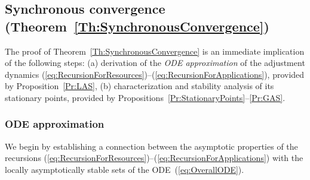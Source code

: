 \documentclass[letter,11pt]{article}
\begin{document}
\subsection{Synchronous convergence (Theorem~\ref{Th:SynchronousConvergence})}	
\label{sec:TD:SynchronousConvergence}

The proof of Theorem~\ref{Th:SynchronousConvergence} is an immediate implication of the following steps: (a) derivation of the \textit{ODE approximation} of the adjustment dynamics (\ref{eq:RecursionForResources})--(\ref{eq:RecursionForApplications}), provided by Proposition~\ref{Pr:LAS}, (b) characterization and stability analysis of its stationary points, provided by Propositions~\ref{Pr:StationaryPoints}--\ref{Pr:GAS}. 

\subsubsection{ODE approximation}	
\label{sec:TD:SC:ODE}

We begin by establishing a connection between the asymptotic properties of the recursions (\ref{eq:RecursionForResources})--(\ref{eq:RecursionForApplications}) with the locally asymptotically stable sets of the ODE~(\ref{eq:OverallODE}).
\end{document}
